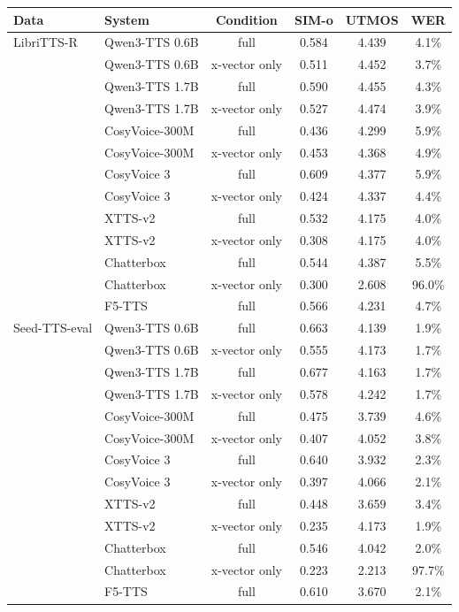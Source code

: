 \begin{tabular}{llcccc}
\toprule
\textbf{Data} & \textbf{System} & \textbf{Condition} & \textbf{SIM-o} & \textbf{UTMOS} & \textbf{WER} \\
\midrule
LibriTTS-R & Qwen3-TTS 0.6B & full & 0.584 & 4.439 & 4.1\% \\
 & Qwen3-TTS 0.6B & x-vector only & 0.511 & 4.452 & 3.7\% \\
 & Qwen3-TTS 1.7B & full & 0.590 & 4.455 & 4.3\% \\
 & Qwen3-TTS 1.7B & x-vector only & 0.527 & 4.474 & 3.9\% \\
 & CosyVoice-300M & full & 0.436 & 4.299 & 5.9\% \\
 & CosyVoice-300M & x-vector only & 0.453 & 4.368 & 4.9\% \\
 & CosyVoice 3 & full & 0.609 & 4.377 & 5.9\% \\
 & CosyVoice 3 & x-vector only & 0.424 & 4.337 & 4.4\% \\
 & XTTS-v2 & full & 0.532 & 4.175 & 4.0\% \\
 & XTTS-v2 & x-vector only & 0.308 & 4.175 & 4.0\% \\
 & Chatterbox & full & 0.544 & 4.387 & 5.5\% \\
 & Chatterbox & x-vector only & 0.300 & 2.608 & 96.0\% \\
 & F5-TTS & full & 0.566 & 4.231 & 4.7\% \\
\midrule
Seed-TTS-eval & Qwen3-TTS 0.6B & full & 0.663 & 4.139 & 1.9\% \\
 & Qwen3-TTS 0.6B & x-vector only & 0.555 & 4.173 & 1.7\% \\
 & Qwen3-TTS 1.7B & full & 0.677 & 4.163 & 1.7\% \\
 & Qwen3-TTS 1.7B & x-vector only & 0.578 & 4.242 & 1.7\% \\
 & CosyVoice-300M & full & 0.475 & 3.739 & 4.6\% \\
 & CosyVoice-300M & x-vector only & 0.407 & 4.052 & 3.8\% \\
 & CosyVoice 3 & full & 0.640 & 3.932 & 2.3\% \\
 & CosyVoice 3 & x-vector only & 0.397 & 4.066 & 2.1\% \\
 & XTTS-v2 & full & 0.448 & 3.659 & 3.4\% \\
 & XTTS-v2 & x-vector only & 0.235 & 4.173 & 1.9\% \\
 & Chatterbox & full & 0.546 & 4.042 & 2.0\% \\
 & Chatterbox & x-vector only & 0.223 & 2.213 & 97.7\% \\
 & F5-TTS & full & 0.610 & 3.670 & 2.1\% \\
\bottomrule
\end{tabular}
